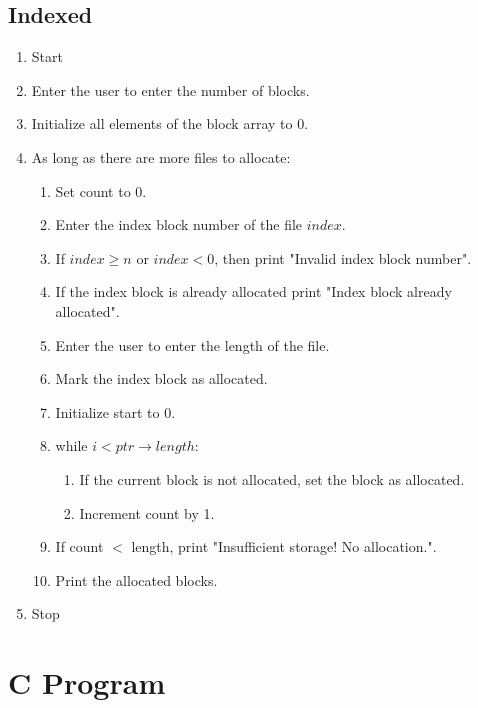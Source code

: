 \subsection{Indexed}
\begin{enumerate}[label=\arabic*.]
    \item Start
    \item Enter the user to enter the number of blocks.
    \item Initialize all elements of the block array to 0.
    \item As long as there are more files to allocate:
    \begin{enumerate}[label=4.\arabic*.]
        \item Set count to 0.
        \item Enter the index block number of the file $index$.
        \item If $index \geq n$ or $index < 0$, then print "Invalid index block number".
        \item If the index block is already allocated print "Index block already allocated".
        \item Enter the user to enter the length of the file.
        \item Mark the index block as allocated.
        \item Initialize start to 0.
        \item while $i < ptr \rightarrow length$:
        \begin{enumerate}[label=(a)]
            \item If the current block is not allocated, set the block as allocated.
            \item Increment count by 1.
        \end{enumerate}
        \item If count $<$ length, print "Insufficient storage! No allocation.".
        \item Print the allocated blocks.
    \end{enumerate}
    \item Stop
\end{enumerate}


\section{C Program}


